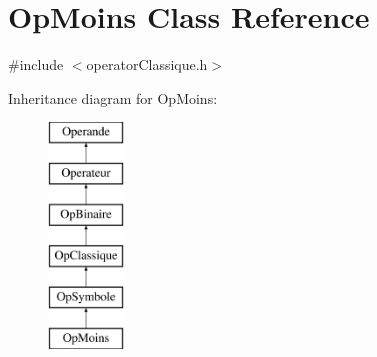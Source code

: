 \hypertarget{class_op_moins}{}\section{Op\+Moins Class Reference}
\label{class_op_moins}


{\ttfamily \#include $<$operator\+Classique.\+h$>$}

Inheritance diagram for Op\+Moins\+:\begin{figure}[H]
\begin{center}
\leavevmode
\includegraphics[height=6.000000cm]{class_op_moins}
\end{center}
\end{figure}
